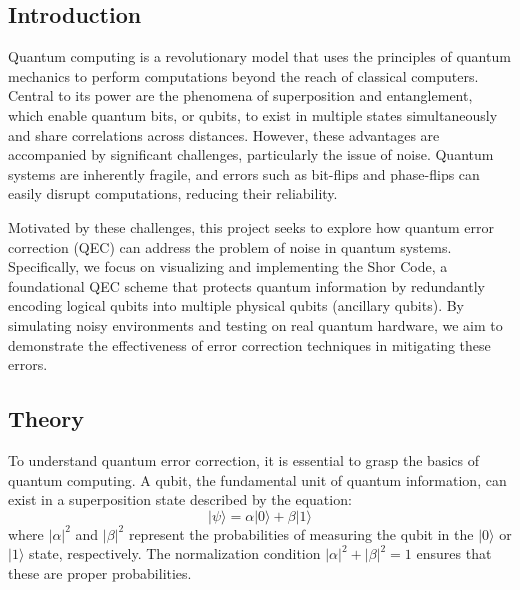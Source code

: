 \documentclass[10pt]{article}
\begin{document}
\begin{multicols}{2}

    \section*{Introduction}
    Quantum computing is a revolutionary model that uses the principles of quantum mechanics to perform computations beyond the reach of classical computers. Central to its power are the phenomena of superposition and entanglement, which enable quantum bits, or qubits, to exist in multiple states simultaneously and share correlations across distances. However, these advantages are accompanied by significant challenges, particularly the issue of noise. Quantum systems are inherently fragile, and errors such as bit-flips and phase-flips can easily disrupt computations, reducing their reliability.\cite{bernhardt}
    
    Motivated by these challenges, this project seeks to explore how quantum error correction (QEC) can address the problem of noise in quantum systems. Specifically, we focus on visualizing and implementing the Shor Code, a foundational QEC scheme that protects quantum information by redundantly encoding logical qubits into multiple physical qubits (ancillary qubits). By simulating noisy environments and testing on real quantum hardware, we aim to demonstrate the effectiveness of error correction techniques in mitigating these errors.
    
    \subsection*{Theory}
    To understand quantum error correction, it is essential to grasp the basics of quantum computing. A qubit, the fundamental unit of quantum information, can exist in a superposition state described by the equation:
    \[
    |\psi\rangle = \alpha|0\rangle + \beta|1\rangle
    \]
    where \( |\alpha|^2 \) and \( |\beta|^2 \) represent the probabilities of measuring the qubit in the \( |0\rangle \) or \( |1\rangle \) state, respectively. The normalization condition \( |\alpha|^2 + |\beta|^2 = 1 \) ensures that these are proper probabilities.
    

\end{multicols}
\end{document}
